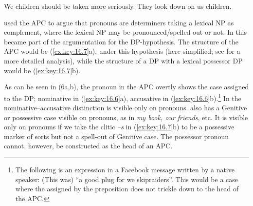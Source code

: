 \documentclass[output=paper]{langsci/langscibook}
\begin{document}
\ea\label{ex:key:16.6}
	\ea We children should be taken more seriously.
	\ex They look down on us children.
	\z
\z

\citet{Postal1969} used the \gls{APC} to
argue that pronouns are determiners taking a lexical NP as complement, where
the lexical NP may be pronounced/spelled out or not. In \citet{Abney1987} this
became part of the argumentation for the DP-hypothesis. The structure of the
\gls{APC} would be (\ref{ex:key:16.7}a),
under this hypothesis (here simplified; see \textcite{Hoehn2017} for a more
detailed analysis), while the structure of a DP with a lexical possessor DP
would be (\ref{ex:key:16.7}b).

\ea\label{ex:key:16.7}
    \ea
    \ex
    \z
\z

As can be seen in (6a,b), the pronoun in the \gls{APC} overtly shows the case
assigned to the DP; nominative in (\ref{ex:key:16.6}a), accusative in
(\ref{ex:key:16.6}b).\footnote{The following is an expression in a Facebook message written by
    a native  speaker:  (This was) “a good plug for we skipraiders”.
This would be a case where the  assigned by the preposition does
not trickle down to the  head of the \gls{APC}.\label{fn:16.2}} In  the
nominative--accusative distinction is visible only on pronouns.  also
has a Genitive or possessive case visible on pronouns, as in \emph{my book, our
friends}, etc. It is visible only on pronouns if we take the clitic \emph{–s}
in (\ref{ex:key:16.7}b) to be a possessive marker of sorts but not a spell-out of Genitive
case. The possessor pronoun cannot, however, be constructed as the head of an
APC.\largerpage[2]
\end{document}

